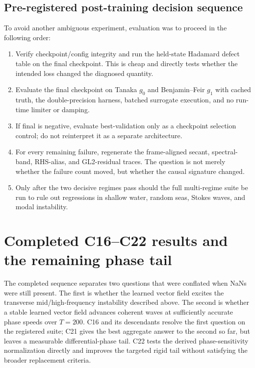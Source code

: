 \documentclass[11pt]{article}
\begin{document}
\subsection{Pre-registered post-training decision sequence}

To avoid another ambiguous experiment, evaluation was to proceed in the
following order:
\begin{enumerate}
  \item Verify checkpoint/config integrity and run the held-state Hadamard
        defect table on the final checkpoint.  This is cheap and directly tests
        whether the intended loss changed the diagnosed quantity.
  \item Evaluate the final checkpoint on Tanaka \(g_0\) and Benjamin--Feir
        \(g_1\) with cached truth, the double-precision harness, batched
        surrogate execution, and no run-time limiter or damping.
  \item If final is negative, evaluate best-validation only as a checkpoint
        selection control; do not reinterpret it as a separate architecture.
  \item For every remaining failure, regenerate the frame-aligned secant,
        spectral-band, RHS-alias, and GL2-residual traces.  The question is not
        merely whether the failure count moved, but whether the causal signature
        changed.
  \item Only after the two decisive regimes pass should the full multi-regime
        suite be run to rule out regressions in shallow water, random seas,
        Stokes waves, and modal instability.
\end{enumerate}

\section{Completed C16--C22 results and the remaining phase tail}
\label{sec:c21-results}

The completed sequence separates two questions that were conflated when NaNs
were still present.  The first is whether the learned vector field excites the
transverse mid/high-frequency instability described above.  The second is
whether a stable learned vector field advances coherent waves at sufficiently
accurate phase speeds over \(T=200\).  C16 and its descendants resolve the
first question on the registered suite; C21 gives the best aggregate answer to
the second so far, but leaves a measurable differential-phase tail.  C22 tests
the derived phase-sensitivity normalization directly and improves the targeted
rigid tail without satisfying the broader replacement criteria.
\end{document}
